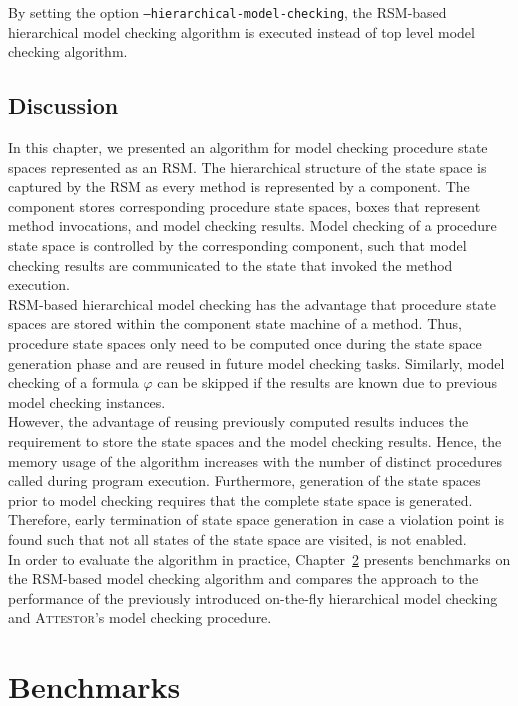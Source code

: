 \documentclass[a4paper, 12pt, twoside]{report}
\begin{document}
	By setting the option \texttt{--hierarchical-model-checking}, the RSM-based hierarchical model checking algorithm is executed instead of top level model checking algorithm.
	
	\section{Discussion}
	
	
	In this chapter, we presented an algorithm for model checking procedure state spaces represented as an RSM. The hierarchical structure of the state space is captured by the RSM as every method is represented by a component. The component stores corresponding procedure state spaces, boxes that represent method invocations, and model checking results. Model checking of a procedure state space is controlled by the corresponding component, such that model checking results are communicated to the state that invoked the method execution. \\
	
	RSM-based hierarchical model checking has the advantage that procedure state spaces are stored within the component state machine of a method. Thus, procedure state spaces only need to be computed once during the state space generation phase and are reused in future model checking tasks. Similarly, model checking of a formula $\varphi$ can be skipped if the results are known due to previous model checking instances.\\	
	
	However, the advantage of reusing previously computed results induces the requirement to store the state spaces and the model checking results. Hence, the memory usage of the algorithm increases with the number of distinct procedures called during program execution. Furthermore, generation of the state spaces prior to model checking requires that the complete state space is generated. Therefore, early termination of state space generation in case a violation point is found such that not all states of the state space are visited, is not enabled.\\	
	
	In order to evaluate the algorithm in practice, Chapter~\ref{chp:benchmarks} presents benchmarks on the RSM-based model checking algorithm and compares the approach to the performance of the previously introduced on-the-fly hierarchical model checking and \textsc{Attestor}'s model checking procedure.
	
	\chapter{Benchmarks}\label{chp:benchmarks}	
	
\end{document}
